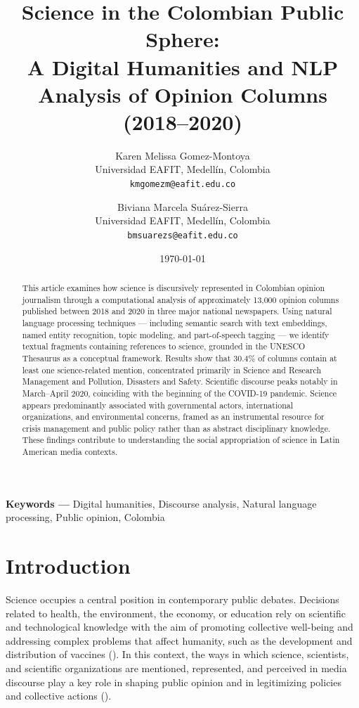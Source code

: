 \documentclass[11pt,a4paper]{article}
\title{Science in the Colombian Public Sphere:  \\
	A Digital Humanities and NLP Analysis of Opinion Columns (2018–2020)}
\author{
	Karen Melissa Gomez-Montoya \\ 
	\small Universidad EAFIT, Medellín, Colombia\\
	\small \texttt{kmgomezm@eafit.edu.co}
	\and
	Biviana Marcela Suárez-Sierra\\ 
	\small Universidad EAFIT, Medellín, Colombia\\
	\small \texttt{bmsuarezs@eafit.edu.co}
}
\date{\today}
\newcommand{\keywords}[1]{\par\noindent\textbf{Keywords  —} #1}
\begin{document}
	\maketitle
	
	\begin{abstract}
	This article examines how science is discursively represented in Colombian opinion journalism through a computational analysis of approximately 13,000 opinion columns published between 2018 and 2020 in three major national newspapers. Using natural language processing techniques — including semantic search with text embeddings, named entity recognition, topic modeling, and part-of-speech tagging — we identify textual fragments containing references to science, grounded in the UNESCO Thesaurus as a conceptual framework. Results show that 30.4\% of columns contain at least one science-related mention, concentrated primarily in Science and Research Management and Pollution, Disasters and Safety. Scientific discourse peaks notably in March–April 2020, coinciding with the beginning of the COVID-19 pandemic. Science appears predominantly associated with governmental actors, international organizations, and environmental concerns, framed as an instrumental resource for crisis management and public policy rather than as abstract disciplinary knowledge. These findings contribute to understanding the social appropriation of science in Latin American media contexts.
		
	\end{abstract}
	
	\keywords{Digital humanities, Discourse analysis, Natural language processing, Public opinion, Colombia}
	

	\section{Introduction}
	
	Science occupies a central position in contemporary public debates. Decisions related to health, the environment, the economy, or education rely on scientific and technological knowledge with the aim of promoting collective well-being and addressing complex problems that affect humanity, such as the development and distribution of vaccines (\cite{Chakravartty2022}). In this context, the ways in which science, scientists, and scientific organizations are mentioned, represented, and perceived in media discourse play a key role in shaping public opinion and in legitimizing policies and collective actions (\cite{Mede2022}).
	
\end{document}
